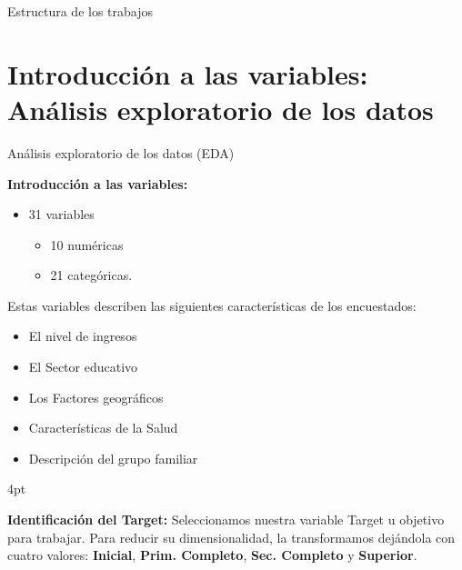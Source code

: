 \documentclass[pdf]{beamer}
\def\vspace{}%
\begin{document}
{\begin{frame}{Estructura de los trabajos}
\begin{enumerate}
    \end{enumerate}
\end{frame}

\section{Introducción a las variables: Análisis exploratorio de los datos}

\begin{frame}{Análisis exploratorio de los datos (EDA)}

    \textbf{Introducción a las variables:}
    \begin{itemize} 
        \item 31 variables
        \begin{itemize} 
            \item 10 numéricas 
            \item 21 categóricas. 
        \end{itemize}
    \end{itemize}
    Estas variables describen las siguientes características de los encuestados:
    \begin{itemize} 
        \item El nivel de ingresos
        \item El Sector educativo
        \item Los Factores geográficos
        \item Características de la Salud
        \item Descripción del grupo familiar
    \end{itemize}
    \vspace{4pt}

    \textbf{Identificación del Target:} Seleccionamos nuestra variable Target u objetivo para trabajar. Para reducir su dimensionalidad, la transformamos dejándola con cuatro valores:  \textbf{Inicial}, \textbf{Prim. Completo}, \textbf{Sec. Completo} y \textbf{Superior}.

\end{frame}
 
}
\end{document}
